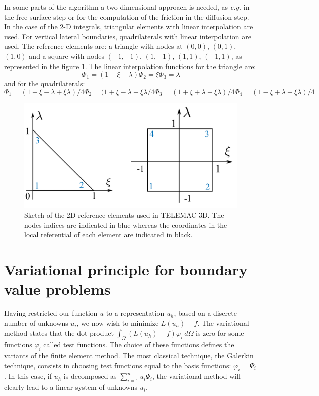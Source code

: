 In some parts of the algorithm a two-dimensional approach is needed, 
as \textit{e.g.} in the free-surface step or for the computation of the 
friction in the diffusion step. In the case of the 2-D integrals, triangular 
elements with linear interpolation are used. For vertical lateral boundaries, 
quadrilaterals with linear interpolation are used. 
The reference elements are: a triangle with nodes at $(0, 0)$, $(0, 1)$, $(1, 0)$ and a square with nodes $(-1,-1)$, $(1,-1)$, $(1, 1)$, $(-1, 1)$, as 
represented in the figure \ref{fig:reference_elements_2D}.
The linear interpolation functions for the triangle are:
\begin{equation}
\Phi_1 = (1 - \xi - \lambda)
\Phi_2 = \xi
\Phi_3 = \lambda
\end{equation}
and for the quadrilaterals:
\begin{equation}
\Phi_1 = (1 - \xi - \lambda + \xi\lambda)/4
\Phi_2 = (1 + \xi - \lambda - \xi\lambda/4
\Phi_3 = (1 + \xi + \lambda + \xi\lambda)/4
\Phi_4 = (1 - \xi + \lambda - \xi\lambda)/4
\end{equation}
\begin{figure}
\begin{center}
\includegraphics[scale=0.5]{./graphics/reference_elements_2D.pdf}
\end{center}
\caption{Sketch of the 2D reference elements used in TELEMAC-3D. 
The nodes indices are indicated in blue whereas the coordinates in the
local referential of each element are indicated in black.}
\label{fig:reference_elements_2D}
\end{figure}

\section{Variational principle for boundary value problems%
%
}

Having restricted our function $u$ to a representation $u_{h}$, based on a
discrete number of unknowns $u_{i}$, we now wish to minimize $L(u_{h})-f$. The
variational method states that the dot product
$\int_{\Omega}(L(u_{h})-f)\varphi_{i}~d\Omega$
is zero for some functions $\varphi_{i}$ called test
functions.
The choice of these functions defines the variants of the finite element
method. The most classical technique, the Galerkin technique, consists in
choosing test functions equal to the basis functions: $\varphi_{i}=\Psi_{i}$.
In this case, if $u_{h}$ is decomposed as $\sum\nolimits_{i=1}^{n}u_{i}%
\Psi_{i}$, the variational method will clearly lead to a linear system of
unknowns $u_{i}$.

